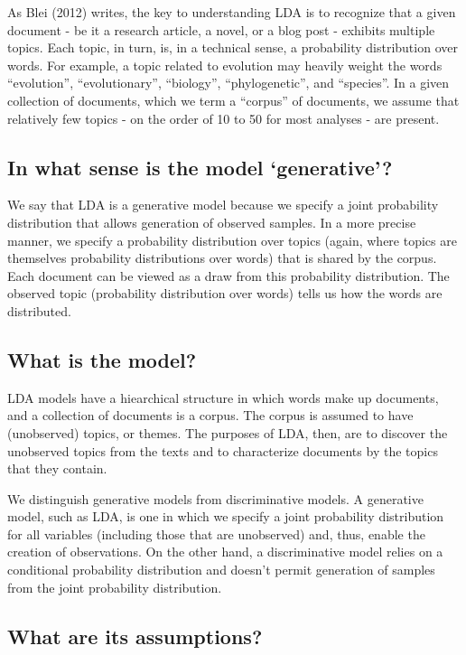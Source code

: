 \documentclass[12pt,]{article}
\begin{document}
As Blei (2012) writes, the key to understanding LDA is to recognize that
a given document - be it a research article, a novel, or a blog post -
exhibits multiple topics. Each topic, in turn, is, in a technical sense,
a probability distribution over words. For example, a topic related to
evolution may heavily weight the words ``evolution'', ``evolutionary'',
``biology'', ``phylogenetic'', and ``species''. In a given collection of
documents, which we term a ``corpus'' of documents, we assume that
relatively few topics - on the order of 10 to 50 for most analyses - are
present.

\subsection{\texorpdfstring{In what sense is the model
`generative'?}{In what sense is the model generative?}}\label{in-what-sense-is-the-model-generative}

We say that LDA is a generative model because we specify a joint
probability distribution that allows generation of observed samples. In
a more precise manner, we specify a probability distribution over topics
(again, where topics are themselves probability distributions over
words) that is shared by the corpus. Each document can be viewed as a
draw from this probability distribution. The observed topic (probability
distribution over words) tells us how the words are distributed.

\subsection{What is the model?}\label{what-is-the-model}

LDA models have a hiearchical structure in which words make up
documents, and a collection of documents is a corpus. The corpus is
assumed to have (unobserved) topics, or themes. The purposes of LDA,
then, are to discover the unobserved topics from the texts and to
characterize documents by the topics that they contain.

We distinguish generative models from discriminative models. A
generative model, such as LDA, is one in which we specify a joint
probability distribution for all variables (including those that are
unobserved) and, thus, enable the creation of observations. On the other
hand, a discriminative model relies on a conditional probability
distribution and doesn't permit generation of samples from the joint
probability distribution.

\subsection{What are its assumptions?}\label{what-are-its-assumptions}
\end{document}
